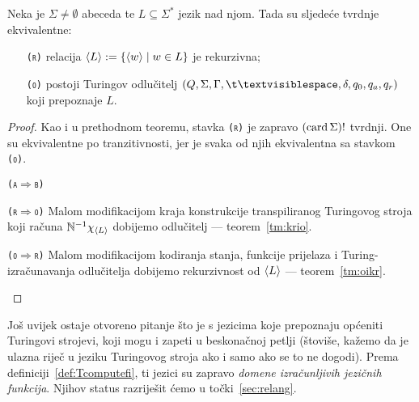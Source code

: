 \begin{teorem}
Neka je $\Sigma\ne\emptyset$ abeceda te $L\subseteq\Sigma^*$ jezik nad njom. Tada su sljedeće tvrdnje ekvivalentne:
\begin{itemize}
    \item[\texttt{\textup{(\textsc r)}}] relacija $\langle L\rangle:=\{\langle w\rangle\mid w\in L\}$ je rekurzivna;
    \item[\texttt{\textup{(\textsc o)}}] postoji Turingov odlučitelj $(Q,\Sigma,\Gamma,\bl,\delta,q_0,q_a,q_r)$ koji prepoznaje $L$.
\end{itemize}
\end{teorem}
\begin{proof}
Kao i u prethodnom teoremu, stavka \texttt{(\textsc r)} je zapravo $(\operatorname{card}\Sigma)!$ tvrdnji. One su ekvivalentne po tranzitivnosti, jer je svaka od njih ekvivalentna sa stavkom \texttt{(\textsc o)}.
\begin{labeling}{\texttt{(\textsc a$\Rightarrow$\textsc b)}}
\item[\texttt{(\textsc r$\Rightarrow$\textsc o)}] Malom modifikacijom kraja konstrukcije transpiliranog Turingovog stro\-ja koji računa ${\mathbb N}^{-1}\chi_{\langle L\rangle}$ dobijemo odlučitelj --- teorem~\ref{tm:krio}.
\item[\texttt{(\textsc o$\Rightarrow$\textsc r)}] Malom modifikacijom kodiranja stanja, funkcije prijelaza i Turing-iz\-ra\-ču\-na\-va\-nja odlučitelja dobijemo rekurzivnost od $\langle L\rangle$ --- teorem~\ref{tm:oikr}.\qedhere
\end{labeling}
\end{proof}

Još uvijek ostaje otvoreno pitanje što je s jezicima koje prepoznaju općeniti Turingovi strojevi, koji mogu i zapeti u beskonačnoj petlji (štoviše, kažemo da je ulazna riječ u jeziku Turingovog stroja ako i samo ako se to ne dogodi). Prema definiciji~\ref{def:Tcomputefi}, ti jezici su zapravo \emph{domene izračunljivih jezičnih funkcija}. Njihov status razriješit ćemo u točki~\ref{sec:relang}.

